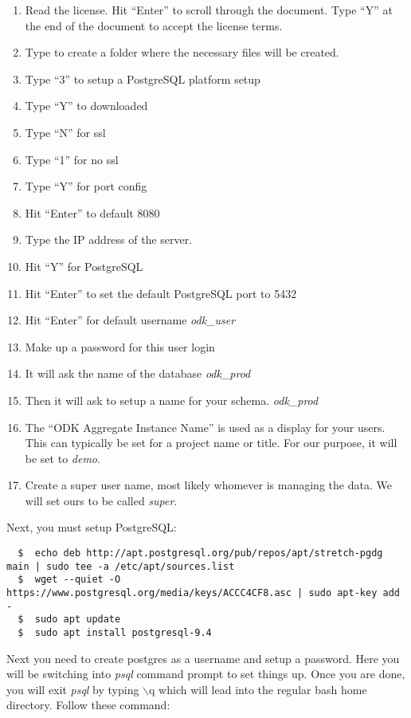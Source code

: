 \begin{enumerate}
\item Read the license. Hit ``Enter'' to scroll through the document. Type ``Y'' at the end of the document to accept the license terms.
\item Type  to create a folder where the necessary files will be created.
\item  Type ``3'' to setup a PostgreSQL platform setup
\item Type ``Y'' to downloaded
\item Type ``N'' for ssl
\item Type ``1'' for no ssl
\item Type ``Y'' for port config
\item Hit ``Enter'' to default 8080
\item Type the IP address of the server.
\item Hit ``Y'' for PostgreSQL
\item Hit ``Enter'' to set the default PostgreSQL port to 5432
\item Hit ``Enter'' for default username \emph{odk\_user}
\item Make up a password for this user login
\item It will ask the name of the database \emph{odk\_prod}
\item Then it will ask to setup a name for your schema. \emph{odk\_prod}
\item The ``ODK Aggregate Instance Name'' is used as a display for your users. This can typically be set for a project name or title. For our purpose, it will be set to
\emph{demo}.
\item Create a super user name, most likely whomever is managing the data. We will set ours to be called \emph{super}.
\end{enumerate}

\noindent
Next, you must setup PostgreSQL:
\begin{lstlisting}
  $  echo deb http://apt.postgresql.org/pub/repos/apt/stretch-pgdg main | sudo tee -a /etc/apt/sources.list
  $  wget --quiet -O https://www.postgresql.org/media/keys/ACCC4CF8.asc | sudo apt-key add -
  $  sudo apt update
  $  sudo apt install postgresql-9.4
\end{lstlisting}

Next you need to create postgres as a username and setup a password. Here you will be switching into \emph{psql} command prompt to set things up. Once you are done, you will exit \emph{psql} by typing $\backslash$q which will lead into the regular bash home directory. Follow these command:

